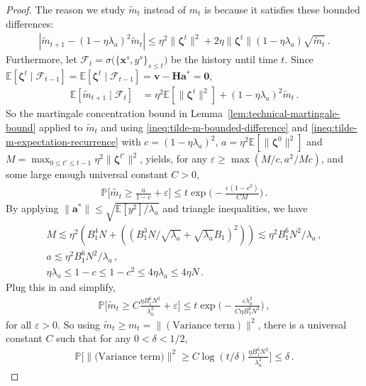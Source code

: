 \documentclass[11pt]{article}
\renewcommand{\P}{\mathbb{P}}
\newcommand{\E}{\mathbb{E}}
\newcommand{\eps}{\varepsilon}
\newcommand{\<}{\langle}
\renewcommand{\>}{\rangle}
\def\bzero{{\boldsymbol 0}}
\theoremstyle{definition}
\def\bH{{\boldsymbol H}}
\def\ba{{\boldsymbol a}}
\def\bv{{\boldsymbol v}}
\def\bx{{\boldsymbol x}}
\def\cF{{\mathcal F}}
\def\bv{{\boldsymbol v}}
\def\bx{{\boldsymbol x}}
\def\ba{{\boldsymbol a}}
\def\cF{{\mathcal F}}
\def\bH{{\boldsymbol H}}
\def\bzeta{{\boldsymbol \zeta}}
\def\eps{\varepsilon}
\begin{document}
\begin{proof}
The reason we study $\tilde{m}_t$ instead of $m_t$ is because it satisfies these bounded differences:
\begin{align}\label{ineq:tilde-m-bounded-difference}
|\tilde{m}_{t+1} - (1-\eta \lambda_a)^2 \tilde{m}_t| \leq \eta^2\|\bzeta^t\|^2 + 2\eta\|\bzeta^t\|(1-\eta \lambda_a)\sqrt{\tilde{m}_t}\,.
\end{align}
Furthermore, let $\cF_t = \sigma \big(\{ \bx^s,y^s \}_{s \leq t} \big)$ be the history until time $t$. Since $\E[\bzeta^t \mid \cF_{t-1}] = \E[\bzeta^t \mid \cF_{t-1}] = \bv - \bH \ba^* = \bzero$,
\begin{align}\label{ineq:tilde-m-expectation-recurrence}
\E[\tilde{m}_{t+1} \mid \cF_{t}] &= \eta^2 \E[\|\bzeta^t\|^2] + (1-\eta \lambda_a)^2 \tilde{m}_t\,.
\end{align}
So the martingale concentration bound in Lemma~\ref{lem:technical-martingale-bound} applied to $\tilde{m}_t$ and using \eqref{ineq:tilde-m-bounded-difference} and \eqref{ineq:tilde-m-expectation-recurrence} with $c = (1-\eta\lambda_a)^2$, $a = \eta^2 \E[\|\bzeta^0\|^2]$ and $M = \max_{0 \leq t' \leq t-1} \eta^2\|\bzeta^{t'}\|^2$, yields, for any $\eps \geq \max(M/c, a^2 / Mc)$, and some large enough universal constant $C > 0$,
\begin{align*}
\P\Big[\tilde{m_t} \geq \frac{a}{1-c} + \eps\Big] \leq t\exp \Big(-\frac{\eps (1-c^2)}{ C M} \Big)\,.
\end{align*}
By applying $\|\ba^*\| \leq \sqrt{\E[y^2] / \lambda_a}$ and triangle inequalities, we have
\begin{gather*}
M \lesssim \eta^2 (B_1^4 N + ((B_1^3 N / \sqrt{\lambda_a} + \sqrt{\lambda_a} B_1)^2)) \lesssim \eta^2 B_1^6 N^2 / \lambda_a \, ,\\
a \lesssim \eta^2 B_1^6 N^2 / \lambda_a \, , \\
\eta \lambda_a \leq 1-c \leq 1 -c^2 \leq 4\eta \lambda_a \leq 4\eta N\,.
\end{gather*}
Plug this in and simplify,
\begin{align*}
\P\Big[\tilde{m}_t \geq C\frac{\eta B_1^6 N^2}{\lambda_a^2} + \eps \Big] \leq t\exp \Big(-\frac{\eps 
\lambda_a^2}{C 
 \eta B_1^6 N^2} \Big)\,,
\end{align*}
for all $\eps > 0$. So using $\tilde{m}_t \geq m_t = \|(\mbox{Variance term})\|^2$, there is a universal constant $C$ such that for any $0 < \delta < 1/2$,
\begin{align}\label{ineq:variance-term-bound}
\P\Big[\|(\mbox{Variance term)}\|^2 \geq C\log(t/\delta)\frac{\eta B_1^6 N^2}{\lambda_a^2} \Big] \leq \delta\,.
\end{align}


\end{proof}
\end{document}
